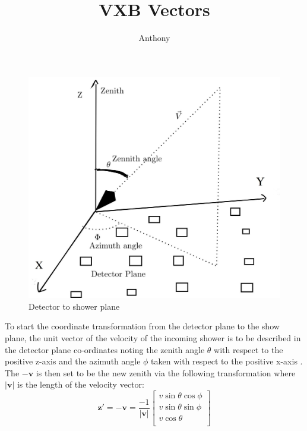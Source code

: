 \documentclass[11pt]{article}
\begin{document}
\author{Anthony}
\title{VXB Vectors}
\maketitle

\begin{figure}[h]
\centering
  \includegraphics[scale=0.2]{vvv.JPG}
  \caption{Detector to shower plane }
  \label{fig:boat1}
\end{figure}

To start the coordinate transformation from the detector plane to the show plane, the unit vector of the velocity of the incoming shower is to be  described in the detector plane co-ordinates noting the zenith angle $\theta$ with respect to the positive z-axis and the azimuth angle $\phi$ taken with respect to the positive x-axis  . The $\mathbf{-{v}}$ is then set to be the new zenith via the following transformation where $\mathbf{|v|}$ is the length of the velocity vector:
\begin{equation}
    \mathbf{\hat{z}'}=\mathbf{-{v}} = \frac{-1}{\left|\mathbf{{v}}\right|}\left[
    \begin{array}{c}
    v\sin\theta \cos\phi \\ 	
    v\sin\theta \sin\phi \\ 
    v\cos\theta \\
\end{array} 
\right]
\end{equation}
\end{document}
